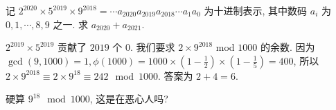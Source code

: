 \begin{prob}
\label{prob:prob-11}
记 $2^{2020} \times 5^{2019} \times 9^{2018} =
\cdots a_{2020}a_{2019}a_{2018}\cdots a_1 a_0$ 为十进制表示,
其中数码 $a_i$ 为 $0, 1, \cdots, 8, 9$ 之一.
求 $a_{2020} + a_{2021}$.
\end{prob}

\begin{soln}
$2^{2019}\times 5^{2019}$ 贡献了 $2019$ 个 $0$.
我们要求 $2 \times 9^{2018}$ mod $1000$ 的余数.
因为 $\gcd(9,1000) = 1, \phi(1000) =
1000\times (1 - \frac{1}{2})\times (1 - \frac{1}{5}) = 400$,
所以 $2 \times 9^{2018} \equiv 2\times 9^{18} \equiv 242 \mod 1000$.
答案为 $2 + 4 = \boxed{6.}$
\end{soln}

\begin{rem*}
硬算 $9^{18} \mod 1000$, 这是在恶心人吗?
\end{rem*}
